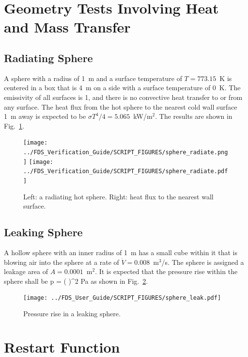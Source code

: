 \documentclass[11pt]{book}
\begin{document}
\newpage

\section{Geometry Tests Involving Heat and Mass Transfer}

\subsection{Radiating Sphere}
\label{sphere_radiate}

A sphere with a radius of 1~m and a surface temperature of $T=773.15$~K is centered in a box that is 4~m on a side with a surface temperature of 0~K. The emissivity of all surfaces is 1, and there is no convective heat transfer to or from any surface. The heat flux from the hot sphere to the nearest cold wall surface 1~m away is expected to be $\sigma T^4/4=5.065$~kW/m$^2$. The results are shown in Fig.~\ref{sphere_radiate_fig}.
\begin{figure}[ht]
\texttt{[image: ../FDS\_Verification\_Guide/SCRIPT\_FIGURES/sphere\_radiate.png]}
\texttt{[image: ../FDS\_Verification\_Guide/SCRIPT\_FIGURES/sphere\_radiate.pdf]}
\caption[The {\ct sphere\_radiate} test case]{Left: a radiating hot sphere. Right: heat flux to the nearest wall surface.}
\label{sphere_radiate_fig}
\end{figure}

\FloatBarrier

\subsection{Leaking Sphere}
\label{sphere_leak}

A hollow sphere with an inner radius of 1~m has a small cube within it that is blowing air into the sphere at a rate of $\dot{V}=0.008$~m$^3$/s. The sphere is assigned a leakage area of $A=0.0001$~m$^2$. It is expected that the pressure rise within the sphere shall be
\be
   \Delta p =  \left(  \right)^2  \; \hbox{Pa}
\ee
as shown in Fig.~\ref{sphere_leak_fig}.
\begin{figure}[ht]
\centering
\texttt{[image: ../FDS\_User\_Guide/SCRIPT\_FIGURES/sphere\_leak.pdf]}
\caption[The {\ct sphere\_leak} test case]{Pressure rise in a leaking sphere.}
\label{sphere_leak_fig}
\end{figure}

\section{Restart Function}
\label{geom_restart}
\label{geom_ls_restart}
\end{document}

